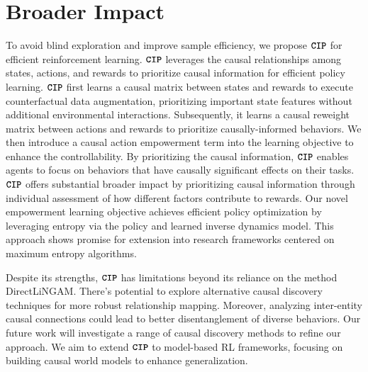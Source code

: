 \maketitle


\clearpage
\appendix
\tableofcontents
\clearpage


\section{Broader Impact}
\label{Broader Impact}
To avoid blind exploration and improve sample efficiency, we propose $\texttt{\textbf{CIP}}$ for efficient reinforcement learning. $\texttt{\textbf{CIP}}$ leverages the causal relationships among states, actions, and rewards to prioritize causal information for efficient policy learning. 
$\texttt{\textbf{CIP}}$ first learns a causal matrix between states and rewards to execute counterfactual data augmentation, prioritizing important state features without additional environmental interactions. Subsequently, it learns a causal reweight matrix between actions and rewards to prioritize causally-informed behaviors. We then introduce a causal action empowerment term into the learning objective to enhance the controllability. By prioritizing the causal information, $\texttt{\textbf{CIP}}$ enables agents to focus on behaviors that have causally significant effects on their tasks. 
$\texttt{\textbf{CIP}}$ offers substantial broader impact by prioritizing causal information through individual assessment of how different factors contribute to rewards. Our novel empowerment learning objective achieves efficient policy optimization by leveraging entropy via the policy and learned inverse dynamics model. This approach shows promise for extension into research frameworks centered on maximum entropy algorithms. 

Despite its strengths, $\texttt{\textbf{CIP}}$ has limitations beyond its reliance on the method DirectLiNGAM. There's potential to explore alternative causal discovery techniques for more robust relationship mapping. Moreover, analyzing inter-entity causal connections could lead to better disentanglement of diverse behaviors. 
Our future work will investigate a range of causal discovery methods to refine our approach. We aim to extend $\texttt{\textbf{CIP}}$ to model-based RL frameworks, focusing on building causal world models to enhance generalization.


